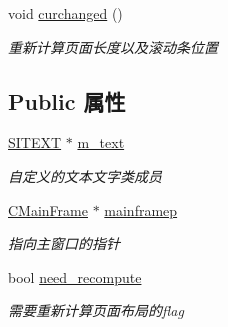 \begin{DoxyCompactItemize}
\mbox{\label{class_c_child_view_ab68bf2b03a8e9aab3f2aac2b9ec3177a}} 
void \hyperlink{class_c_child_view_ab68bf2b03a8e9aab3f2aac2b9ec3177a}{curchanged} ()
\begin{DoxyCompactList}\small\item\em 重新计算页面长度以及滚动条位置 \end{DoxyCompactList}\end{DoxyCompactItemize}
\subsection*{Public 属性}
\begin{DoxyCompactItemize}
\item 
\hyperlink{class_s_i_t_e_x_t}{S\+I\+T\+E\+XT} $\ast$ \hyperlink{class_c_child_view_a7a8d14e1c1adfb50fa6e033ebc05a357}{m\+\_\+text}
\begin{DoxyCompactList}\small\item\em 自定义的文本文字类成员 \end{DoxyCompactList}\item 
\mbox{\label{class_c_child_view_a5c52f5e75191a707906b1334f0281376}} 
\hyperlink{class_c_main_frame}{C\+Main\+Frame} $\ast$ \hyperlink{class_c_child_view_a5c52f5e75191a707906b1334f0281376}{mainframep}
\begin{DoxyCompactList}\small\item\em 指向主窗口的指针 \end{DoxyCompactList}\item 
\mbox{\label{class_c_child_view_a7a2763ed4f49e10e4efc2c89fdf3bbbf}} 
bool \hyperlink{class_c_child_view_a7a2763ed4f49e10e4efc2c89fdf3bbbf}{need\+\_\+recompute}
\begin{DoxyCompactList}\small\item\em 需要重新计算页面布局的flag \end{DoxyCompactList}\end{DoxyCompactItemize}
